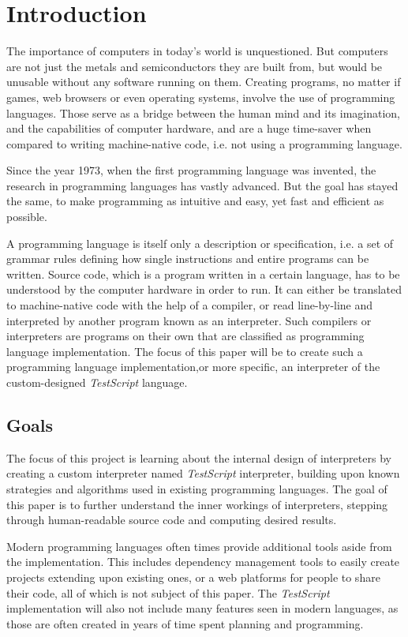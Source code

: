 \documentclass[12pt,a4paper]{article}
\newcommand{\name}{\emph{TestScript}}
\begin{document}
{
    \small
    \newpage
    \hypersetup{hidelinks}
    \tableofcontents\newpage
}

\normalsize
\onehalfspacing
\section{Introduction}
The importance of computers in today's world is unquestioned.
But computers are not just the metals and semiconductors they are built from,
but would be unusable without any software running on them.
Creating programs, no matter if games, web browsers or even operating systems,
involve the use of programming languages.
Those serve as a bridge between the human mind and its imagination, and
the capabilities of computer hardware, and are a huge time-saver when compared
to writing machine-native code, i.e. not using a programming language.

Since the year 1973, when the first programming language was invented, the
research in programming languages has vastly advanced. But the goal has stayed
the same, to make programming as intuitive and easy, yet fast and efficient as
possible.

A programming language is itself only a description or specification, i.e. a
set of grammar rules defining how single instructions and entire programs
can be written. Source code, which is a program written in a certain language,
has to be understood by the computer hardware in order to run. It can either
be translated to machine-native code with the help of a compiler, or
read line-by-line and interpreted by another program known as an interpreter.
Such compilers or interpreters are programs on their own that are classified
as programming language implementation. The focus of this paper will be to
create such a programming language implementation,or more specific, an interpreter
of the custom-designed \name{} language.

\subsection{Goals}
The focus of this project is learning about the internal design of interpreters
by creating a custom interpreter named \name{} interpreter, building upon
known strategies and algorithms used in existing programming languages.
The goal of this paper is to further understand the inner workings of
interpreters, stepping through human-readable source code and computing
desired results.

Modern programming languages often times provide additional tools aside from
the implementation. This includes dependency management tools to
easily create projects extending upon existing ones, or a web platforms for
people to share their code, all of which is not subject of this paper.
The \name{} implementation will also not include many features seen in modern
languages, as those are often created in years of time spent planning and
programming.
\end{document}
